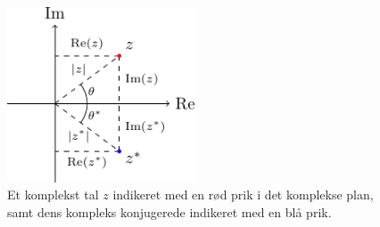 \begin{figure}[t]
	\centering
	\includegraphics[width=0.5\textwidth]{Matematik/matfig/complex_plane.pdf}
	\caption{Et komplekst tal $z$ indikeret med en rød prik i det komplekse plan, samt dens kompleks konjugerede indikeret med en blå prik.}
	\label{mat:fig:complex_plane}
\end{figure} 

